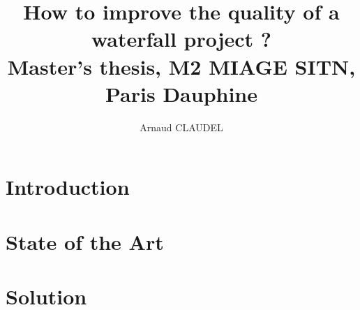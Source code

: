 \documentclass[12pt]{report}
\title{
How to improve the quality of a waterfall project ?
\\ {\large Master's thesis, M2 MIAGE SITN, Paris Dauphine}}
\author{Arnaud CLAUDEL}
\begin{document}
    \maketitle
    \tableofcontents

    \chapter{Introduction}\label{ch:introduction}
    

    \chapter{State of the Art}\label{ch:state-of-the-art}
    

    \chapter{Solution}\label{ch:solution}
    
\end{document}
